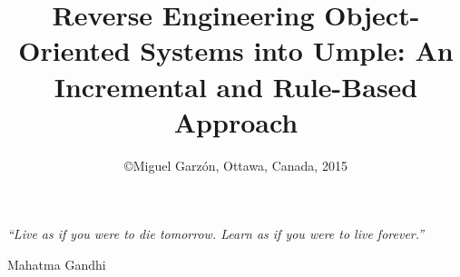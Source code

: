 \documentclass[a4paper, 11pt, oneside]{Thesis}  %
\begin{document}
\frontmatter      %

\title  {Reverse Engineering Object-Oriented Systems into Umple: An Incremental and Rule-Based Approach}
\date  {\normalsize \copyright Miguel Garz\'{o}n, Ottawa, Canada, 2015}

\maketitle


\fancyhead{}  %

\rhead{\thepage}  %
\lhead{}  %

\pagestyle{fancy}  %

\setcounter{page}{2}
\null\vfill
\textit{``Live as if you were to die tomorrow. Learn as if you were to live forever.''}

\begin{flushright}
Mahatma Gandhi   
\end{flushright}

\vfill\vfill\vfill\vfill\vfill\vfill\null
\clearpage  %
\end{document}
